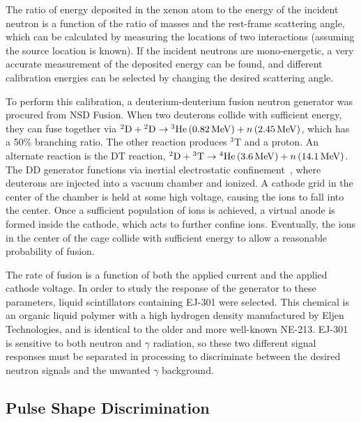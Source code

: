 \documentclass[phys,dissertation]{puthesis}
\begin{document}
The ratio of energy deposited in the xenon atom to the energy of the incident neutron is a function of the ratio of masses and the rest-frame scattering angle, which can be calculated by measuring the locations of two interactions (assuming the source location is known). If the incident neutrons are mono-energetic, a very accurate measurement of the deposited energy can be found, and different calibration energies can be selected by changing the desired scattering angle.

To perform this calibration, a deuterium-deuterium fusion neutron generator was procured from NSD Fusion. When two deuterons collide with sufficient energy, they can fuse together via ${}^2\mathrm{D} + {}^2\mathrm{D} \rightarrow {}^3\mathrm{He}\, (0.82\,\mathrm{MeV}) + n \,(2.45\,\mathrm{MeV})$, which has a 50\% branching ratio. The other reaction produces $^3$T and a proton. An alternate reaction is the DT reaction, ${}^2\mathrm{D} + {}^3\mathrm{T} \rightarrow {}^4\mathrm{He} \,(3.6\,\mathrm{MeV}) + n \,(14.1\,\mathrm{MeV})$. The DD generator functions via inertial electrostatic confinement~\cite{Miley1997}, where deuterons are injected into a vacuum chamber and ionized. A cathode grid in the center of the chamber is held at some high voltage, causing the ions to fall into the center. Once a sufficient population of ions is achieved, a virtual anode is formed inside the cathode, which acts to further confine ions. Eventually, the ions in the center of the cage collide with sufficient energy to allow a reasonable probability of fusion.

The rate of fusion is a function of both the applied current and the applied cathode voltage. In order to study the response of the generator to these parameters, liquid scintillators containing EJ-301 were selected. This chemical is an organic liquid polymer with a high hydrogen density manufactured by Eljen Technologies, and is identical to the older and more well-known NE-213. EJ-301 is sensitive to both neutron and $\gamma$ radiation, so these two different signal responses must be separated in processing to discriminate between the desired neutron signals and the unwanted $\gamma$ background.

\subsection{Pulse Shape Discrimination}
\end{document}
